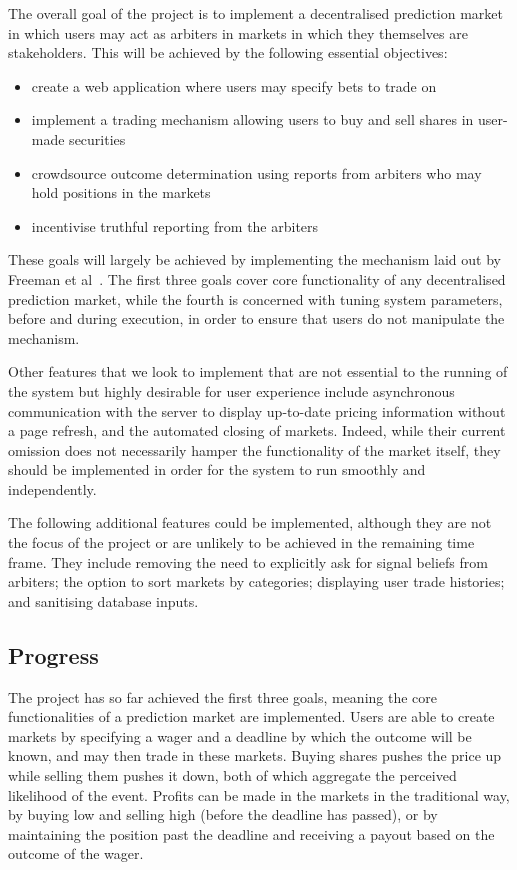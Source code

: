 \documentclass[10pt,a4paper]{article}
\theoremstyle{plain}
\theoremstyle{definition}
\begin{document}
The overall goal of the project is to implement a decentralised prediction
market in which users may act as arbiters in markets in which they themselves
are stakeholders. This will be achieved by the following essential objectives:

\begin{itemize}
	\itemsep0em
	\item create a web application where users may specify bets to trade on
	\item implement a trading mechanism allowing users to buy and sell
		shares in user-made securities
	\item crowdsource outcome determination using reports from arbiters who may
		hold positions in the markets
	\item incentivise truthful reporting from the arbiters
\end{itemize}

These goals will largely be achieved by implementing the mechanism laid out by
Freeman et al~\cite{CODiPM}. The first three goals cover core functionality of
any decentralised prediction market, while the fourth is concerned with tuning
system parameters, before and during execution, in order to ensure that users
do not manipulate the mechanism.
 
Other features that we look to implement that are not essential to the running
of the system but highly desirable for user experience include asynchronous
communication with the server to display up-to-date pricing information without
a page refresh, and the automated closing of markets.  Indeed, while their
current omission does not necessarily hamper the functionality of the market
itself, they should be implemented in order for the system to run smoothly and
independently.

The following additional features could be implemented, although they are not
the focus of the project or are unlikely to be achieved in the remaining time
frame. They include removing the need to explicitly ask for signal beliefs
from arbiters; the option to sort markets by categories; displaying user trade
histories; and sanitising database inputs.

\subsection{Progress} 

The project has so far achieved the first three goals, meaning the core
functionalities of a prediction market are implemented. Users are able to
create markets by specifying a wager and a deadline by which the outcome will
be known, and may then trade in these markets. Buying shares pushes the price
up while selling them pushes it down, both of which aggregate the perceived
likelihood of the event. Profits can be made in the markets in the traditional
way, by buying low and selling high (before the deadline has passed), or by
maintaining the position past the deadline and receiving a payout based on the
outcome of the wager.
\end{document}

